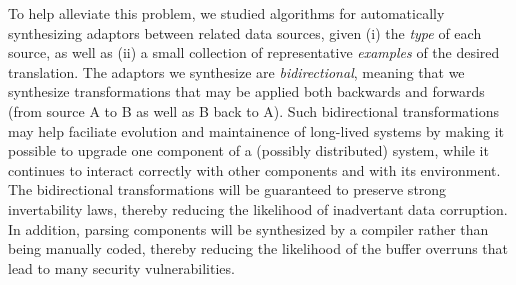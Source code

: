 \documentclass[12pt]{article}
\begin{document}
To help alleviate this problem, we studied algorithms 
for automatically synthesizing adaptors between related data
sources, given (i) the \emph{type} of each
source, as well as (ii) a small collection of
representative \emph{examples} of the desired translation.  The
adaptors we synthesize are \emph{bidirectional}, meaning
that we synthesize transformations that may be applied both
backwards and forwards (from source A to B as well as B back to A).
Such bidirectional transformations may help faciliate evolution and
maintainence of long-lived systems by making it possible to upgrade
one component of a (possibly distributed) system, while it continues
to interact correctly with other components and with its environment.
The bidirectional transformations will be guaranteed to preserve
strong invertability laws, thereby reducing the likelihood of
inadvertant data corruption.  In addition, parsing components
will be synthesized by a compiler rather than being manually coded,
thereby reducing the likelihood of the buffer overruns that lead to
many security vulnerabilities.
\end{document}
